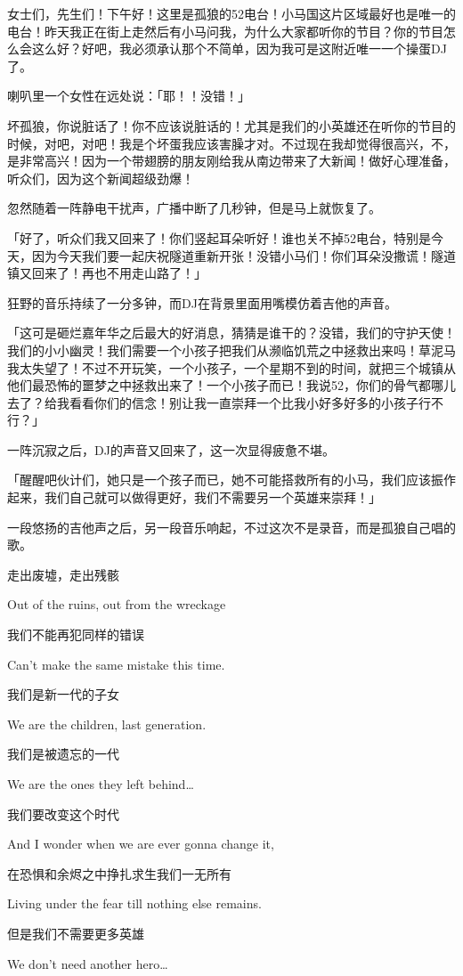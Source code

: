 {\rt 女士们，先生们！下午好！这里是孤狼的52电台！小马国这片区域最好也是唯一的电台！昨天我正在街上走然后有小马问我，为什么大家都听你的节目？你的节目怎么会这么好？好吧，我必须承认那个不简单，因为我可是这附近唯一一个操蛋DJ了。}

喇叭里一个女性在远处说：「{\rt 耶！！没错！}」

{\rt 坏孤狼，你说脏话了！你不应该说脏话的！尤其是我们的小英雄还在听你的节目的时候，对吧，对吧！我是个坏蛋我应该害臊才对。不过现在我却觉得很高兴，不，是非常高兴！因为一个带翅膀的朋友刚给我从南边带来了大新闻！做好心理准备，听众们，因为这个新闻超级劲爆！}

忽然随着一阵静电干扰声，广播中断了几秒钟，但是马上就恢复了。

「{\rt 好了，听众们我又回来了！你们竖起耳朵听好！谁也关不掉52电台，特别是今天，因为今天我们要一起庆祝隧道重新开张！没错小马们！你们耳朵没撒谎！隧道镇又回来了！再也不用走山路了！}」

狂野的音乐持续了一分多钟，而DJ在背景里面用嘴模仿着吉他的声音。

「{\rt 这可是砸烂嘉年华之后最大的好消息，猜猜是谁干的？没错，我们的守护天使！我们的小小幽灵！我们需要一个小孩子把我们从濒临饥荒之中拯救出来吗！草泥马我太失望了！不过不开玩笑，一个小孩子，一个星期不到的时间，就把三个城镇从他们最恐怖的噩梦之中拯救出来了！一个小孩子而已！我说52，你们的骨气都哪儿去了？给我看看你们的信念！别让我一直崇拜一个比我小好多好多的小孩子行不行？}」

一阵沉寂之后，DJ的声音又回来了，这一次显得疲惫不堪。

「{\rt 醒醒吧伙计们，她只是一个孩子而已，她不可能搭救所有的小马，我们应该振作起来，我们自己就可以做得更好，我们不需要另一个英雄来崇拜！}」

一段悠扬的吉他声之后，另一段音乐响起，不过这次不是录音，而是孤狼自己唱的歌。

\begin{song}
走出废墟，走出残骸

Out of the ruins, out from the wreckage

\medskip

我们不能再犯同样的错误

Can't make the same mistake this time.

\medskip

我们是新一代的子女

We are the children, last generation.

\medskip

我们是被遗忘的一代

We are the ones they left behind\dots

\medskip

我们要改变这个时代

And I wonder when we are ever gonna change it,

\medskip

在恐惧和余烬之中挣扎求生我们一无所有

Living under the fear till nothing else remains.

\medskip

但是我们不需要更多英雄

We don't need another hero\dots
\end{song}


